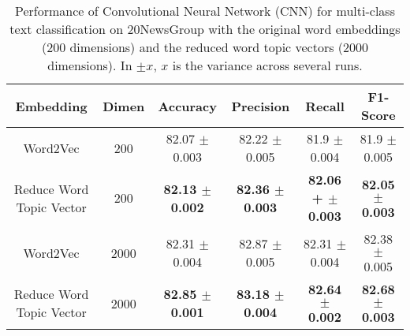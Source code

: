 \documentclass{ecai}
\begin{document}
\begin{table*}
\captionsetup{font=small, skip=0pt}
\caption{Performance of Convolutional Neural Network (CNN) for multi-class text classification on 20NewsGroup with the original word embeddings ($200$ dimensions) and the reduced word topic vectors ($2000$ dimensions). In $\pm x$, $x$ is the variance across several runs.}
\small
\begin{center}
\begin{tabular}{ c|c|c|c|c|c }
\hline
\bf Embedding &\bf Dimen &\bf Accuracy &\bf Precision &\bf Recall &\bf F1-Score \\
\hline
Word2Vec & 200 & 82.07 $\pm$ 0.003  & 82.22 $\pm$ 0.005 & 81.9 $\pm$ 0.004 & 81.9 $\pm$ 0.005\\
Reduce Word Topic Vector & 200 &\bf 82.13 $\pm$  0.002 &\bf 82.36 $\pm$ 0.003 &\bf 82.06 + $\pm$ 0.003 &\bf 82.05 $\pm$ 0.003\\ \hline
Word2Vec & 2000 & 82.31 $\pm$ 0.004 & 82.87 $\pm$ 0.005 &   82.31 $\pm$ 0.004 & 82.38 $\pm$ 0.005 \\
Reduce Word Topic Vector & 2000 &\bf 82.85 $\pm$  0.001 &\bf 83.18 $\pm$ 0.004  &\bf 82.64 $\pm$ 0.002 &\bf 82.68 $\pm$ 0.003 \\
\hline
\end{tabular}
\end{center}
\label{table:CNNResults20NewsGroup}
\vspace{-0.5em}
\end{table*}
\end{document}
